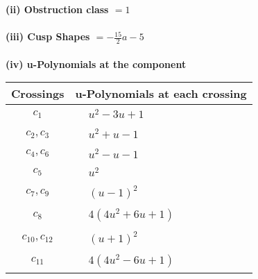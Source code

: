 \documentclass[1p]{elsarticle_modified}
\theoremstyle{definition}
\begin{document}
\flushleft \textbf{(ii) Obstruction class $= 1$}\\~\\
\flushleft \textbf{(iii) Cusp Shapes $= -\frac{15}{2} a-5$}\\~\\
\newpage\renewcommand{\arraystretch}{1}
\flushleft \textbf{(iv) u-Polynomials at the component}\newline \\
\begin{tabular}{m{50pt}|m{274pt}}
Crossings & \hspace{64pt}u-Polynomials at each crossing \\
\hline $$\begin{aligned}c_{1}\end{aligned}$$&$\begin{aligned}
&u^2-3 u+1
\end{aligned}$\\
\hline $$\begin{aligned}c_{2},c_{3}\end{aligned}$$&$\begin{aligned}
&u^2+u-1
\end{aligned}$\\
\hline $$\begin{aligned}c_{4},c_{6}\end{aligned}$$&$\begin{aligned}
&u^2- u-1
\end{aligned}$\\
\hline $$\begin{aligned}c_{5}\end{aligned}$$&$\begin{aligned}
&u^2
\end{aligned}$\\
\hline $$\begin{aligned}c_{7},c_{9}\end{aligned}$$&$\begin{aligned}
&(u-1)^2
\end{aligned}$\\
\hline $$\begin{aligned}c_{8}\end{aligned}$$&$\begin{aligned}
&4(4 u^2+6 u+1)
\end{aligned}$\\
\hline $$\begin{aligned}c_{10},c_{12}\end{aligned}$$&$\begin{aligned}
&(u+1)^2
\end{aligned}$\\
\hline $$\begin{aligned}c_{11}\end{aligned}$$&$\begin{aligned}
&4(4 u^2-6 u+1)
\end{aligned}$\\
\hline
\end{tabular}\\~\\
\end{document}
